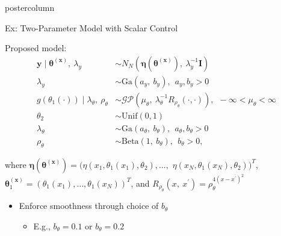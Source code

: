 \documentclass[final,10pt]{beamer}  %
\newlength{\columnheight}
\begin{document}
\begin{frame}{}
\begin{columns}[t]
\begin{column}{.33\textwidth}
\begin{beamercolorbox}[center,wd=1.325\textwidth]{postercolumn}
\begin{minipage}[T]{\textwidth}
{%
        \begin{block}{Ex: Two-Parameter Model with Scalar Control}
            {\small
            Proposed model:
            \begin{equation*}
            \begin{aligned}
                \mathbf{y} \mid \boldsymbol{\theta}^{(\mathbf{x})}, ~\lambda_y &\sim N_N(\boldsymbol{\eta}(\boldsymbol{\theta}^{(\mathbf{x})}), ~\lambda_y^{-1}\mathbf{I})\\
                \lambda_y &\sim \text{Ga}(a_y, ~b_y), ~~a_y, b_y > 0\\
                g(\theta_1(\cdot)) \mid \lambda_{\theta}, ~\rho_{\theta} &\sim \mathcal{GP}(\mu_{\theta}, ~\lambda_{\theta}^{-1}R_{\rho_{\theta}}(\cdot, \cdot)), ~~-\infty < \mu_{\theta} < \infty\\
                \theta_2 &\sim \text{Unif}(0, 1)\\
                \lambda_{\theta} &\sim \text{Ga}(a_{\theta}, ~b_{\theta}), ~~a_{\theta}, b_{\theta} > 0\\
                \rho_{\theta} &\sim \text{Beta}(1, ~b_{\theta}), ~~b_{\theta} > 0,
            \end{aligned}
        \end{equation*}

        where $\boldsymbol{\eta}(\boldsymbol{\theta}^{(\mathbf{x})}) = (\eta(x_1, \theta_1(x_1), \theta_2), \ldots,$ $\eta(x_N, \theta_1(x_N), \theta_2))^T$, $\boldsymbol{\theta}_1^{(\mathbf{x})} = (\theta_1(x_1), \ldots, \theta_1(x_N))^T$, and $R_{\rho_{\theta}}(x, ~x^{\prime}) = \rho_{\theta}^{4(x - x^{\prime})^2}$\\

        \begin{itemize}\itemsep2ex
            \item
            Enforce smoothness through choice of $b_{\theta}$
            \begin{itemize}
                \item
                E.g., $b_{\theta}= 0.1$ or $b_{\theta} = 0.2$
            \end{itemize}


\end{itemize}}
\end{block}}
\end{minipage}
\end{beamercolorbox}
\end{column}
\end{columns}
\end{frame}
\end{document}
